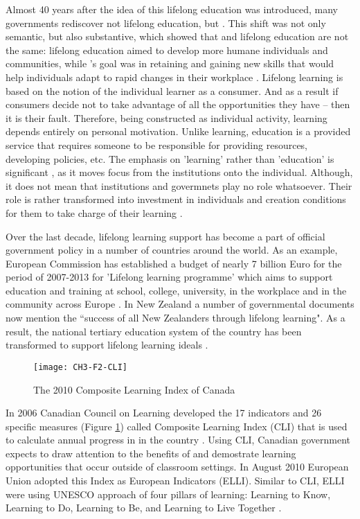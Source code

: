 Almost 40 years after the idea of this lifelong education was introduced, many
governments rediscover not lifelong education, but \LLLs \citep{Boshier2000}.
This shift was not only semantic, but also substantive, which showed that \LLLs
and lifelong education are not the same: lifelong education aimed to develop
more humane individuals and communities, while \LLLsn's goal was in retaining
and gaining new skills that would help individuals adapt to rapid changes in
their workplace \citep{Medel-Anonuevo2001}. Lifelong learning is based on the
notion of the individual learner as a consumer. And as a result if consumers
decide not to take advantage of all the opportunities they have -- then it is
their fault. Therefore, being constructed as individual activity, learning
depends entirely on personal motivation. Unlike learning, education is a
provided service \citep{Boshier2000} that requires someone to be responsible for
providing resources, developing policies, etc. The emphasis on 'learning' rather
than 'education' is significant \citep{Tuijnman2002}, as it moves focus from the
institutions onto the individual. Although, it does not mean that institutions
and govermnets play no role whatsoever. Their role is rather transformed into
investment in individuals and creation conditions for them to take charge of
their learning \citep{Chen2009}.

Over the last decade, lifelong learning support has become a part of official
government policy in a number of countries around the world. As an example,
European Commission has established a budget of nearly 7 billion Euro for the
period of 2007-2013 for 'Lifelong learning programme' which aims to support
education and training at school, college, university, in the workplace and in
the community across Europe \citep{TheEducation2009}. In New Zealand a number of
governmental documents \citep{NewZealandMinistryofEducation2008} now mention
the ``success of all New Zealanders through lifelong learning". As a result, the
national tertiary education system of the country has been transformed to
support lifelong learning ideals \citep{Benseman2006}.

\begin{figure}[htb]
\centering
\texttt{[image: CH3-F2-CLI]}
\caption[The 2010 Composite Learning Index of Canada]{The 2010 Composite
Learning Index of Canada}
\label{fig:cli2010}
\end{figure}

In 2006 Canadian Council on Learning developed the 17 indicators and 26
specific measures (Figure \ref{fig:cli2010}) called Composite Learning Index
(CLI) that is used to calculate annual progress in \LLLs in the country
\citep{CanadianCouncilonLearning2011}. Using CLI, Canadian government expects to
draw attention to the benefits of \LLLs and demostrate learning opportunities
that occur outside of classroom settings. In August 2010 European Union adopted
this Index as European \LLLc Indicators (ELLI). Similar to CLI, ELLI were using
UNESCO approach of four pillars of learning: Learning to Know, Learning to Do,
Learning to Be, and Learning to Live Together \citep{ELLIDevelopmentTeam2010}.

